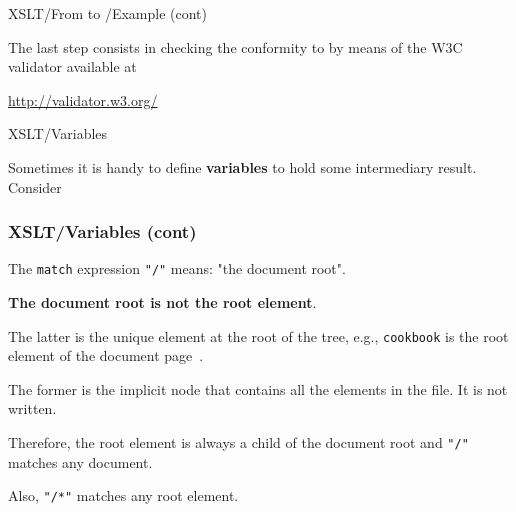 %
\begin{frame}{XSLT/From \XML to \XHTML{}/Example (cont)}

The last step consists in checking the conformity to \XHTML by means
of the W3C validator available at
\begin{center}
\url{http://validator.w3.org/}
\end{center}

\end{frame}

%
\begin{frame}{XSLT/Variables}

Sometimes it is handy to define \textbf{variables} to hold some
intermediary result. Consider 

\end{frame}

%
\begin{frame}[containsverbatim]
\frametitle{XSLT/Variables (cont)}

The \texttt{match} expression \verb|"/"| means: "the document
root".
\begin{center}
\textbf{The document root is not the root element}.
\end{center}
The latter is the unique element at the root of the \XML tree, e.g.,
\texttt{cookbook} is the root element of the document
page~\pageref{cookbook.xml}.

\bigskip

The former is the implicit node that contains all the elements in the
\XSLT file. It is not written.

\bigskip

Therefore, the root element is always a child of the document root and
\verb|"/"| matches any \XML document.

\bigskip

Also, \verb|"/*"| matches any root element.

\end{frame}

